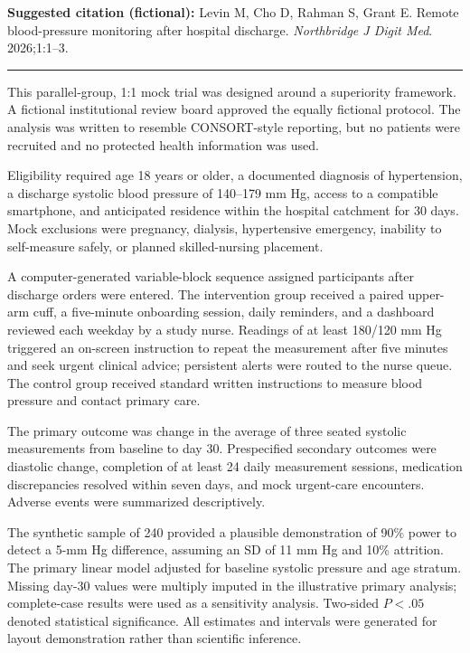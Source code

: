 \documentclass[9pt,twocolumn]{article}
\newcommand{\articleSection}[1]{%
  \par\vspace{5pt}%
  \noindent{\large\bfseries\color{journalblue}#1}\par\vspace{1pt}%
  \noindent\textcolor{journalblue}{\rule{\columnwidth}{0.45pt}}\par\vspace{2pt}%
}
\newcommand{\subsectiontitle}[1]{\vspace{3pt}{\bfseries #1}\par}
\begin{document}
\vfill
{\scriptsize\color{textgray}\textbf{Suggested citation (fictional):} Levin M, Cho D, Rahman S, Grant E. Remote blood-pressure monitoring after hospital discharge. \textit{Northbridge J Digit Med}. 2026;1:1--3.}

\clearpage

\articleSection{Methods}

\subsectiontitle{Study design and oversight}
This parallel-group, 1:1 mock trial was designed around a superiority framework. A fictional institutional review board approved the equally fictional protocol. The analysis was written to resemble CONSORT-style reporting, but no patients were recruited and no protected health information was used.

\subsectiontitle{Participants}
Eligibility required age 18 years or older, a documented diagnosis of hypertension, a discharge systolic blood pressure of 140--179 mm Hg, access to a compatible smartphone, and anticipated residence within the hospital catchment for 30 days. Mock exclusions were pregnancy, dialysis, hypertensive emergency, inability to self-measure safely, or planned skilled-nursing placement.

\subsectiontitle{Randomization and intervention}
A computer-generated variable-block sequence assigned participants after discharge orders were entered. The intervention group received a paired upper-arm cuff, a five-minute onboarding session, daily reminders, and a dashboard reviewed each weekday by a study nurse. Readings of at least 180/120 mm Hg triggered an on-screen instruction to repeat the measurement after five minutes and seek urgent clinical advice; persistent alerts were routed to the nurse queue. The control group received standard written instructions to measure blood pressure and contact primary care.

\subsectiontitle{Outcomes}
The primary outcome was change in the average of three seated systolic measurements from baseline to day 30. Prespecified secondary outcomes were diastolic change, completion of at least 24 daily measurement sessions, medication discrepancies resolved within seven days, and mock urgent-care encounters. Adverse events were summarized descriptively.

\subsectiontitle{Statistical analysis}
The synthetic sample of 240 provided a plausible demonstration of 90\% power to detect a 5-mm Hg difference, assuming an SD of 11 mm Hg and 10\% attrition. The primary linear model adjusted for baseline systolic pressure and age stratum. Missing day-30 values were multiply imputed in the illustrative primary analysis; complete-case results were used as a sensitivity analysis. Two-sided $P<.05$ denoted statistical significance. All estimates and intervals were generated for layout demonstration rather than scientific inference.
\end{document}
